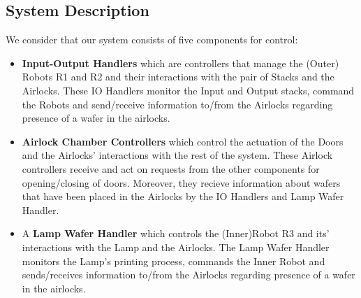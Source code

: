 \documentclass[a4paper,12pt]{article}
\begin{document}
	\subsection {System Description}
	We consider that our system consists of five components for control:
	\begin{itemize}
		\item \textbf{Input-Output Handlers} which are controllers that manage the (Outer) Robots R1 and R2 and their interactions with the pair of Stacks and the Airlocks. These IO Handlers monitor the Input and Output stacks, command the Robots and send/receive information to/from the Airlocks regarding presence of a wafer in the airlocks.
		\item \textbf{Airlock Chamber Controllers} which control the actuation of the Doors and the Airlocks' interactions with the rest of the system. These Airlock controllers receive and act on requests from the other components for opening/closing of doors. Moreover, they recieve information about wafers that have been placed in the Airlocks by the IO Handlers and Lamp Wafer Handler.
		\item A \textbf{Lamp Wafer Handler} which controls the (Inner)Robot R3 and its' interactions with the Lamp and the Airlocks. The Lamp Wafer Handler monitors the Lamp's printing process, commands the Inner Robot and sends/receives information to/from the Airlocks regarding presence of a wafer in the airlocks.
	\end{itemize}
	
\end{document}
